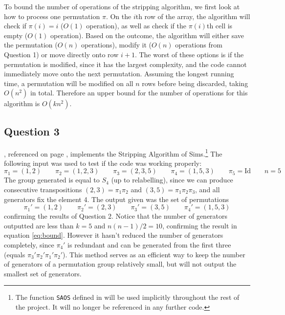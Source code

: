 \documentclass[10pt,a4paper,notitlepage]{article}
\newcommand{\Id}{\text{Id}}
\begin{document}
To bound the number of operations of the stripping algorithm, we first look at how to process one permutation $\pi$. On the $i$th row of the array,  the algorithm will check if $\pi(i)=i$ ($O(1)$ operation), as well as check if the $\pi(i)$th cell is empty ($O(1)$ operation). Based on the outcome, the algorithm will either save the permutation ($O(n)$ operations), modify it ($O(n)$ operations from Question 1) or move directly onto row $i+1$. The worst of these options is if the permutation is modified, since it has the largest complexity, and the code cannot immediately move onto the next permutation. Assuming the longest running time, a permutation will be modified on all $n$ rows before being discarded,  taking $O(n^{2})$ in total. Therefore an upper bound for the number of operations for this algorithm is $O(kn^{2})$.

\subsection*{\centering Question 3}
, referenced on page \pageref{cd:3}, implements the Stripping Algorithm of Sims.\footnote{The function \texttt{SAOS} defined in  will be used implicitly throughout the rest of the project. It will no longer be referenced in any further code.} The following input was used to test if the code was working properly:
\begin{equation*}
\pi_{1}=(1,2) \quad\quad \pi_{2}=(1,2,3) \quad\quad \pi_{3}=(2,3,5) \quad\quad \pi_{4}=(1,5,3) \quad\quad \pi_{5}=\Id \quad\quad n=5
\end{equation*}
The group generated is equal to $S_{4}$ (up to relabelling), since we can produce consecutive transpositions $(2,3)=\pi_{1}\pi_{2}$ and $(3,5)=\pi_{1}\pi_{2}\pi_{3}$, and all generators fix the element 4. The output given was the set of permutations 
\begin{equation*}
\pi_{1}'= (1,2) \quad\quad \pi_{2}'=(2,3) \quad\quad \pi_{3}'=(3,5) \quad\quad \pi_{4}'=(1,5,3)
\end{equation*}
confirming the results of Question 2. Notice that the number of generators outputted are less than $k=5$ and $n(n-1)/2=10$, confirming the result in equation \eqref{eq:bound}. However it hasn't reduced the number of generators completely, since $\pi_{4}'$ is redundant and can be generated from the first three (equals $\pi_{3}'\pi_{2}'\pi_{1}'\pi_{2}'$). This method serves as an efficient way to keep the number of generators of a permutation group relatively small, but will not output the smallest set of generators.\\
\end{document}
